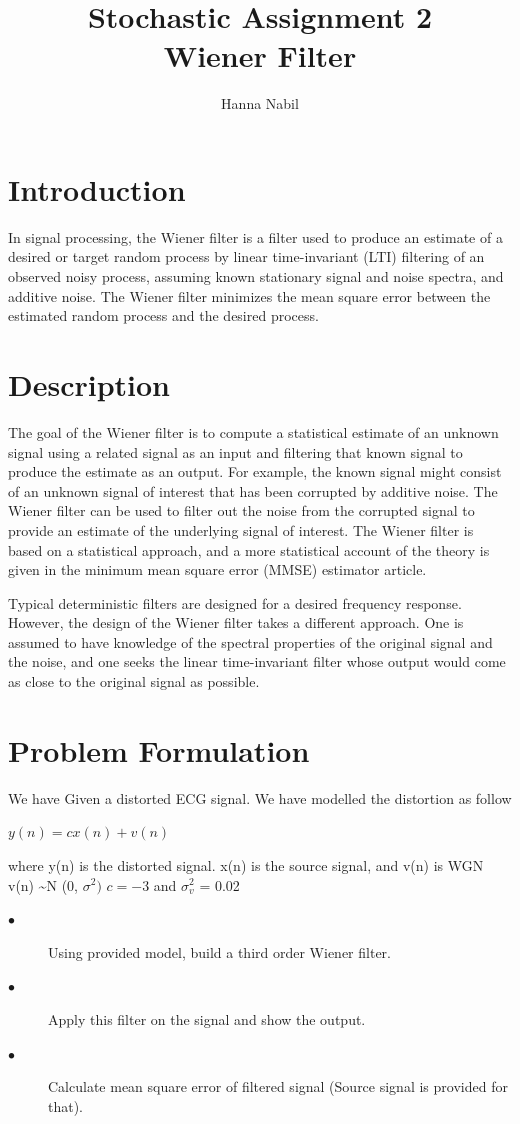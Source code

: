 \documentclass{article}
\begin{document}
\title{Stochastic Assignment  2 \\ Wiener Filter}
\author{Hanna Nabil}
\maketitle

\section{Introduction}
In signal processing, the Wiener filter is a filter used to produce an estimate of a desired or target random process by linear time-invariant (LTI) filtering of an observed noisy process, assuming known stationary signal and noise spectra, and additive noise. The Wiener filter minimizes the mean square error between the estimated random process and the desired process.
\section{Description}

The goal of the Wiener filter is to compute a statistical estimate of an unknown signal using a related signal as an input and filtering that known signal to produce the estimate as an output. For example, the known signal might consist of an unknown signal of interest that has been corrupted by additive noise. The Wiener filter can be used to filter out the noise from the corrupted signal to provide an estimate of the underlying signal of interest. The Wiener filter is based on a statistical approach, and a more statistical account of the theory is given in the minimum mean square error (MMSE) estimator article.

Typical deterministic filters are designed for a desired frequency response. However, the design of the Wiener filter takes a different approach. One is assumed to have knowledge of the spectral properties of the original signal and the noise, and one seeks the linear time-invariant filter whose output would come as close to the original signal as possible. 


\section{Problem Formulation}
We have Given a distorted ECG signal. We have modelled the distortion as  follow

\centerline{$y(n) = cx(n) + v(n)$}          
where y(n) is the distorted signal. x(n) is the source signal, and v(n) is WGN v(n) \sim N (0, $\sigma ^{2})$ 
 $c = -3 $   and $\sigma_v ^{2}$ = 0.02
\begin{description}

\item [$\bullet$ ] Using provided model, build a third order Wiener filter.
\item [$\bullet$ ]  Apply this filter on the signal and show the  output.
\item [$\bullet$ ] Calculate mean square error of filtered signal (Source signal is provided for that).

\end{description}
 
\end{document}
